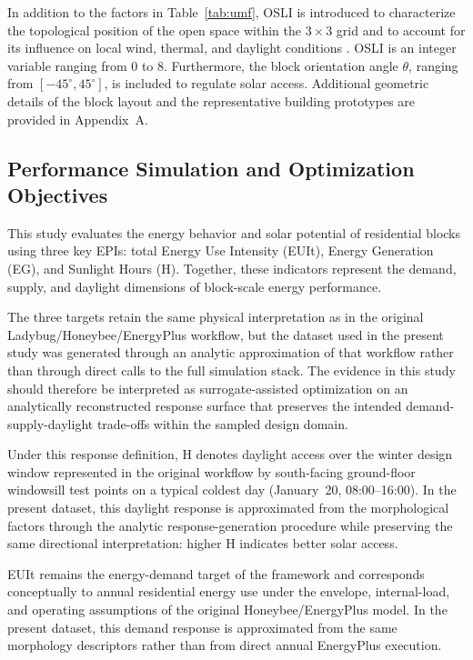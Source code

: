 \documentclass[final,3p,times]{elsarticle}
\begin{document}
In addition to the factors in Table~\ref{tab:umf}, OSLI is introduced to characterize the topological position of the open space within the $3\times3$ grid and to account for its influence on local wind, thermal, and daylight conditions \cite{ref17,ref18}. OSLI is an integer variable ranging from 0 to 8. Furthermore, the block orientation angle $\theta$, ranging from $[-45^\circ,45^\circ]$, is included to regulate solar access. Additional geometric details of the block layout and the representative building prototypes are provided in Appendix~A.

\subsection{Performance Simulation and Optimization Objectives}

This study evaluates the energy behavior and solar potential of residential blocks using three key EPIs: total Energy Use Intensity (EUIt), Energy Generation (EG), and Sunlight Hours (H). Together, these indicators represent the demand, supply, and daylight dimensions of block-scale energy performance.

The three targets retain the same physical interpretation as in the original Ladybug/Honeybee/EnergyPlus workflow, but the dataset used in the present study was generated through an analytic approximation of that workflow rather than through direct calls to the full simulation stack. The evidence in this study should therefore be interpreted as surrogate-assisted optimization on an analytically reconstructed response surface that preserves the intended demand-supply-daylight trade-offs within the sampled design domain.

Under this response definition, H denotes daylight access over the winter design window represented in the original workflow by south-facing ground-floor windowsill test points on a typical coldest day (January~20, 08:00--16:00). In the present dataset, this daylight response is approximated from the morphological factors through the analytic response-generation procedure while preserving the same directional interpretation: higher H indicates better solar access.

EUIt remains the energy-demand target of the framework and corresponds conceptually to annual residential energy use under the envelope, internal-load, and operating assumptions of the original Honeybee/EnergyPlus model. In the present dataset, this demand response is approximated from the same morphology descriptors rather than from direct annual EnergyPlus execution.
\end{document}
